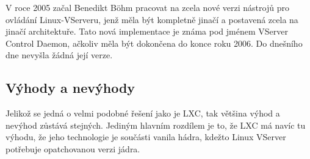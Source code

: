 V roce 2005 začal Benedikt Böhm pracovat na zcela nové verzi nástrojů pro ovládání Linux-VServeru, jenž měla být kompletně jinačí a postavená zcela na jinačí architektuře. Tato nová implementace je známa pod jménem VServer Control Daemon, ačkoliv měla být dokončena do konce roku 2006. Do dnešního dne nevyšla žádná její verze.

\subsection{Výhody a nevýhody}

Jelikož se jedná o velmi podobné řešení jako je LXC, tak většina výhod a nevýhod zůstává stejných. Jediným hlavním rozdílem je to, že LXC má navíc tu výhodu, že jeho technologie je součásti vanila hádra, kdežto Linux VServer potřebuje opatchovanou verzi jádra.
